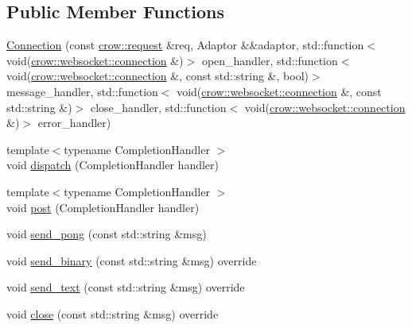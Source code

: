 \subsection*{Public Member Functions}
\begin{DoxyCompactItemize}
\item 
\hyperlink{classcrow_1_1websocket_1_1_connection_a0dc63c6029b95a412bcc7388e1385ad9}{Connection} (const \hyperlink{structcrow_1_1request}{crow\-::request} \&req, Adaptor \&\&adaptor, std\-::function$<$ void(\hyperlink{structcrow_1_1websocket_1_1connection}{crow\-::websocket\-::connection} \&)$>$ open\-\_\-handler, std\-::function$<$ void(\hyperlink{structcrow_1_1websocket_1_1connection}{crow\-::websocket\-::connection} \&, const std\-::string \&, bool)$>$ message\-\_\-handler, std\-::function$<$ void(\hyperlink{structcrow_1_1websocket_1_1connection}{crow\-::websocket\-::connection} \&, const std\-::string \&)$>$ close\-\_\-handler, std\-::function$<$ void(\hyperlink{structcrow_1_1websocket_1_1connection}{crow\-::websocket\-::connection} \&)$>$ error\-\_\-handler)
\item 
{\footnotesize template$<$typename Completion\-Handler $>$ }\\void \hyperlink{classcrow_1_1websocket_1_1_connection_a7a11996bd55dcc65c1c376cea1dd7b00}{dispatch} (Completion\-Handler handler)
\item 
{\footnotesize template$<$typename Completion\-Handler $>$ }\\void \hyperlink{classcrow_1_1websocket_1_1_connection_ac3d4cebfc05076982ff002b7c3186ade}{post} (Completion\-Handler handler)
\item 
void \hyperlink{classcrow_1_1websocket_1_1_connection_ab8ed4f1eba00fc2f2d9e4547391e99f5}{send\-\_\-pong} (const std\-::string \&msg)
\item 
void \hyperlink{classcrow_1_1websocket_1_1_connection_ae28e1265b68dfe0f4f99a68a52a57979}{send\-\_\-binary} (const std\-::string \&msg) override
\item 
void \hyperlink{classcrow_1_1websocket_1_1_connection_aa60e803417bb2d13cda3f0da7d68459f}{send\-\_\-text} (const std\-::string \&msg) override
\item 
void \hyperlink{classcrow_1_1websocket_1_1_connection_a210e06034d286e82a3fd090b9a239c86}{close} (const std\-::string \&msg) override
\end{DoxyCompactItemize}
